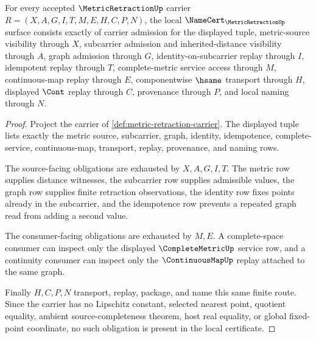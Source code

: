 \begin{theorem}
\label{thm:metric-retraction-namecert-obligations}
For every accepted $\MetricRetractionUp$ carrier $R=(X,A,G,I,T,M,E,H,C,P,N)$, the local $\NameCert_{\MetricRetractionUp}$ surface consists exactly of carrier admission for the displayed tuple, metric-source visibility through $X$, subcarrier admission and inherited-distance visibility through $A$, graph admission through $G$, identity-on-subcarrier replay through $I$, idempotent replay through $T$, complete-metric service access through $M$, continuous-map replay through $E$, componentwise $\hsame$ transport through $H$, displayed $\Cont$ replay through $C$, provenance through $P$, and local naming through $N$.
\end{theorem}
\begin{proof}
Project the carrier of \autoref{def:metric-retraction-carrier}. The displayed tuple lists exactly the metric source, subcarrier, graph, identity, idempotence, complete-service, continuous-map, transport, replay, provenance, and naming rows.

The source-facing obligations are exhausted by $X,A,G,I,T$. The metric row supplies distance witnesses, the subcarrier row supplies admissible values, the graph row supplies finite retraction observations, the identity row fixes points already in the subcarrier, and the idempotence row prevents a repeated graph read from adding a second value.

The consumer-facing obligations are exhausted by $M,E$. A complete-space consumer can inspect only the displayed $\CompleteMetricUp$ service row, and a continuity consumer can inspect only the $\ContinuousMapUp$ replay attached to the same graph.

Finally $H,C,P,N$ transport, replay, package, and name this same finite route. Since the carrier has no Lipschitz constant, selected nearest point, quotient equality, ambient source-completeness theorem, host real equality, or global fixed-point coordinate, no such obligation is present in the local certificate.
\end{proof}

